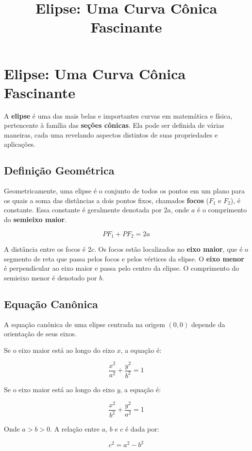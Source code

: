 \documentclass{article}
\title{Elipse: Uma Curva Cônica Fascinante}
\author{} %
\date{} %
\begin{document}
\maketitle

\section*{Elipse: Uma Curva Cônica Fascinante}

A \textbf{elipse} é uma das mais belas e importantes curvas em matemática e física, pertencente à família das \textbf{seções cônicas}. Ela pode ser definida de várias maneiras, cada uma revelando aspectos distintos de suas propriedades e aplicações.

\subsection*{Definição Geométrica}

Geometricamente, uma elipse é o conjunto de todos os pontos em um plano para os quais a soma das distâncias a dois pontos fixos, chamados \textbf{focos} ($F_1$ e $F_2$), é constante. Essa constante é geralmente denotada por $2a$, onde $a$ é o comprimento do \textbf{semieixo maior}.

$$PF_1 + PF_2 = 2a$$

A distância entre os focos é $2c$. Os focos estão localizados no \textbf{eixo maior}, que é o segmento de reta que passa pelos focos e pelos vértices da elipse. O \textbf{eixo menor} é perpendicular ao eixo maior e passa pelo centro da elipse. O comprimento do semieixo menor é denotado por $b$.

\subsection*{Equação Canônica}

A equação canônica de uma elipse centrada na origem $(0,0)$ depende da orientação de seus eixos.

Se o eixo maior está ao longo do eixo $x$, a equação é:

$$\frac{x^2}{a^2} + \frac{y^2}{b^2} = 1$$

Se o eixo maior está ao longo do eixo $y$, a equação é:

$$\frac{x^2}{b^2} + \frac{y^2}{a^2} = 1$$

Onde $a > b > 0$. A relação entre $a$, $b$ e $c$ é dada por:

$$c^2 = a^2 - b^2$$
\end{document}
